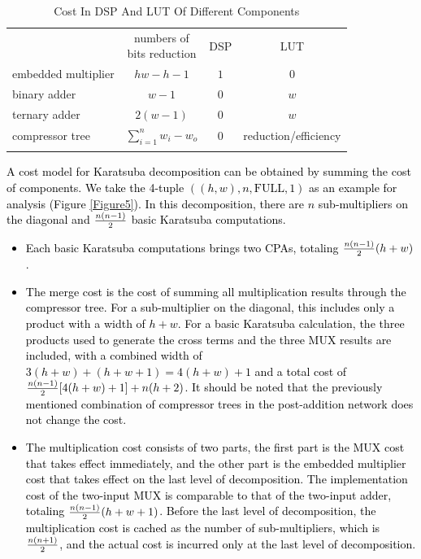 \documentclass[conference]{IEEEtran}
\begin{document}
\begin{table}[ht]
    \centering
    \caption{Cost In DSP And LUT Of Different Components}
    \renewcommand{\arraystretch}{1.5}
    \begin{tabular}{l|c|c|c}
                \Xhline{1.5pt}
                         & \makecell[c]{numbers of \\ bits reduction} & DSP  & LUT      \\
                \Xhline{1pt}
        embedded multiplier     &   $ hw-h-1 $  &   $1$ &   $0$    \\
                \Xhline{1pt} 
        binary adder   &   $ w-1 $     &   $0$ &   $w$    \\
                \Xhline{1pt}
        ternary adder  &   $2(w-1)$    &   $0$ &   $w$    \\
                \Xhline{1pt} 
        compressor tree  &  $ \sum_{i=1}^n w_i-w_o $    &   $ 0 $   &   reduction/efficiency    \\
                \Xhline{1.5pt} 
    \end{tabular}
    \label{computational_primitives_cost}
\end{table}

\textcolor{black}{
A cost model for Karatsuba decomposition can be obtained by summing the cost of components. We take the 4-tuple $((h,w), n, \text{FULL}, 1)$ as an example for analysis (Figure \ref{Figure5}). In this decomposition, there are $n$ sub-multipliers on the diagonal and $n(n-1)\over 2$ basic Karatsuba computations.
\begin{itemize}
    \item Each basic Karatsuba computations brings two CPAs, totaling ${n(n-1)\over 2}(h+w)$.
    \item The merge cost is the cost of summing all multiplication results through the compressor tree. For a sub-multiplier on the diagonal, this includes only a product with a width of $h+w$. For a basic Karatsuba calculation, the three products used to generate the cross terms and the three MUX results are included, with a combined width of $3(h+w)+(h+w+1) = 4(h+w)+1$ and a total cost of ${n(n-1)\over 2}[4(h+w)+1] + n(h+2)$. It should be noted that the previously mentioned combination of compressor trees in the post-addition network does not change the cost.
    \item The multiplication cost consists of two parts, the first part is the MUX cost that takes effect immediately, and the other part is the embedded multiplier cost that takes effect on the last level of decomposition. The implementation cost of the two-input MUX is comparable to that of the two-input adder, totaling ${n(n-1)\over 2}(h+w+1)$. Before the last level of decomposition, the multiplication cost is cached as the number of sub-multipliers, which is $n(n+1)\over 2$, and the actual cost is incurred only at the last level of decomposition.
\end{itemize}
}
\end{document}
